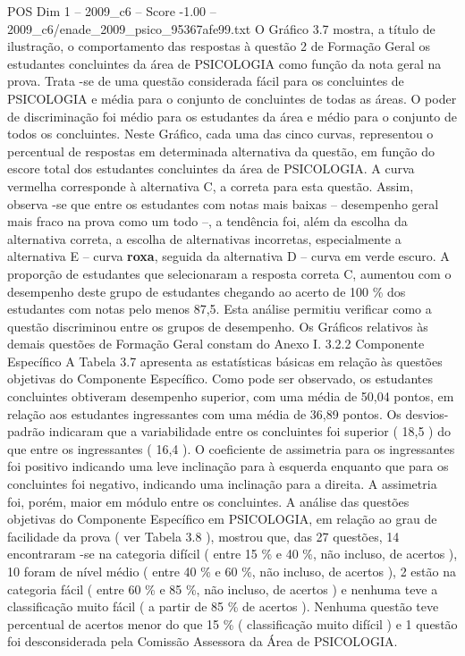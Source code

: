 \begin{textsample}{POS Dim 1 – 2009\_c6 – Score -1.00 – 2009\_c6/enade\_2009\_psico\_95367afe99.txt}
O Gráfico 3.7 mostra, a título de ilustração, o comportamento das respostas à questão 2 de Formação Geral os estudantes concluintes da área de PSICOLOGIA como função da nota geral na prova.
Trata -se de uma questão considerada fácil para os concluintes de PSICOLOGIA e média para o conjunto de concluintes de todas as áreas.
O poder de discriminação foi médio para os estudantes da área e médio para o conjunto de todos os concluintes.
Neste Gráfico, cada uma das cinco curvas, representou o percentual de respostas em determinada alternativa da questão, em função do escore total dos estudantes concluintes da área de PSICOLOGIA.
A curva vermelha corresponde à alternativa C, a correta para esta questão.
Assim, observa -se que entre os estudantes com notas mais baixas – desempenho geral mais fraco na prova como um todo –, a tendência foi, além da escolha da alternativa correta, a escolha de alternativas incorretas, especialmente a alternativa E – curva \textbf{roxa}, seguida da alternativa D – curva em verde escuro.
A proporção de estudantes que selecionaram a resposta correta C, aumentou com o desempenho deste grupo de estudantes chegando ao acerto de 100 \% dos estudantes com notas pelo menos 87,5.
Esta análise permitiu verificar como a questão discriminou entre os grupos de desempenho.
Os Gráficos relativos às demais questões de Formação Geral constam do Anexo I. 3.2.2 Componente Específico A Tabela 3.7 apresenta as estatísticas básicas em relação às questões objetivas do Componente Específico.
Como pode ser observado, os estudantes concluintes obtiveram desempenho superior, com uma média de 50,04 pontos, em relação aos estudantes ingressantes com uma média de 36,89 pontos.
Os desvios-padrão indicaram que a variabilidade entre os concluintes foi superior ( 18,5 ) do que entre os ingressantes ( 16,4 ).
O coeficiente de assimetria para os ingressantes foi positivo indicando uma leve inclinação para à esquerda enquanto que para os concluintes foi negativo, indicando uma inclinação para a direita.
A assimetria foi, porém, maior em módulo entre os concluintes.
A análise das questões objetivas do Componente Específico em PSICOLOGIA, em relação ao grau de facilidade da prova ( ver Tabela 3.8 ), mostrou que, das 27 questões, 14 encontraram -se na categoria difícil ( entre 15 \% e 40 \%, não incluso, de acertos ), 10 foram de nível médio ( entre 40 \% e 60 \%, não incluso, de acertos ), 2 estão na categoria fácil ( entre 60 \% e 85 \%, não incluso, de acertos ) e nenhuma teve a classificação muito fácil ( a partir de 85 \% de acertos ).
Nenhuma questão teve percentual de acertos menor do que 15 \% ( classificação muito difícil ) e 1 questão foi desconsiderada pela Comissão Assessora da Área de PSICOLOGIA.

\end{textsample}

